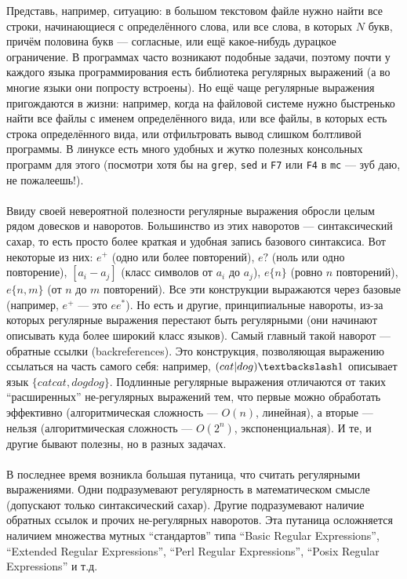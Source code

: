 \documentclass[11pt]{book}
\begin{document}
Представь, например, ситуацию: в большом текстовом файле нужно найти все строки, начинающиеся с определённого слова,
или все слова, в которых $N$ букв, причём половина букв --- согласные, или ещё какое-нибудь дурацкое ограничение.
В программах часто возникают подобные задачи, поэтому почти у каждого языка программирования есть библиотека регулярных выражений
(а во многие языки они попросту встроены).
Но ещё чаще регулярные выражения пригождаются в жизни: например, когда на файловой системе нужно быстренько найти все файлы с именем определённого вида,
или все файлы, в которых есть строка определённого вида, или отфильтровать вывод слишком болтливой программы.
В линуксе есть много удобных и жутко полезных консольных программ для этого
(посмотри хотя бы на \texttt{grep}, \texttt{sed} и \texttt{F7} или \texttt{F4} в \texttt{mc} --- зуб даю, не пожалеешь!).
\\ \\
Ввиду своей невероятной полезности регулярные выражения обросли целым рядом довесков и наворотов.
Большинство из этих наворотов --- синтаксический сахар, то есть просто более краткая и удобная запись базового синтаксиса.
Вот некоторые из них:
$e^+$ (одно или более повторений),
$e?$ (ноль или одно повторение),
$[a_i-a_j]$ (класс символов от $a_i$ до $a_j$),
$e\{n\}$ (ровно $n$ повторений),
$e\{n,m\}$ (от $n$ до $m$ повторений).
Все эти конструкции выражаются через базовые (например, $e^+$ --- это $ee^*$).
Но есть и другие, принципиальные навороты, из-за которых регулярные выражения перестают быть регулярными
(они начинают описывать куда более широкий класс языков).
Самый главный такой наворот --- обратные ссылки (backreferences).
Это конструкция, позволяющая выражению ссылаться на часть самого себя:
например, $(cat|dog)\textbackslash1$ описывает язык $\{catcat,dogdog\}$.
Подлинные регулярные выражения отличаются от таких ``расширенных'' не-регулярных выражений тем,
что первые можно обработать эффективно (алгоритмическая сложность --- $O(n)$, линейная),
а вторые --- нельзя (алгоритмическая сложность --- $O(2^n)$, экспоненциальная).
И те, и другие бывают полезны, но в разных задачах.
\\ \\
В последнее время возникла большая путаница, что считать регулярными выражениями.
Одни подразумевают регулярность в математическом смысле (допускают только синтаксический сахар).
Другие подразумевают наличие обратных ссылок и прочих не-регулярных наворотов.
Эта путаница осложняется наличием множества мутных ``стандартов'' типа
``Basic Regular Expressions'', ``Extended Regular Expressions'', ``Perl Regular Expressions'', ``Posix Regular Expressions'' и т.д.
\end{document}
